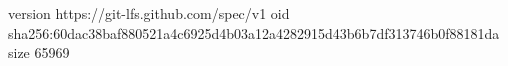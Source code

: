 version https://git-lfs.github.com/spec/v1
oid sha256:60dac38baf880521a4c6925d4b03a12a4282915d43b6b7df313746b0f88181da
size 65969
